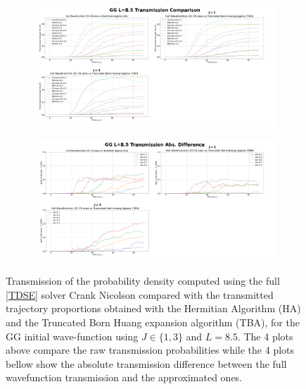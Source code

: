 \documentclass[11pt, a4paper]{article} %
\begin{document}
\begin{figure}[p]
  \centering
  \begin{subfigure}[b]{1.1\linewidth}
    \includegraphics[width=\linewidth]{Example_Results/GG_L_8.5_transmission.png}
  \end{subfigure}
  \begin{subfigure}[b]{1.1\linewidth}
    \includegraphics[width=\linewidth]{Example_Results/GG_L_8.5_errors.png}
     \end{subfigure}

  
  \caption{ Transmission of the probability density computed using the full \ref{TDSE} solver Crank Nicolson compared with the transmitted trajectory proportions obtained with the Hermitian Algorithm (HA) and the Truncated Born Huang expansion algorithm (TBA), for the GG initial wave-function using $J\in\{1,3\}$ and $L=8.5$. The 4 plots above compare the raw transmission probabilities while the 4 plots bellow show the absolute transmission difference between the full wavefunction transmission and the approximated ones.}
 \label{fig:transm_GG_L85}
 \end{figure}

\newpage
\end{document}
